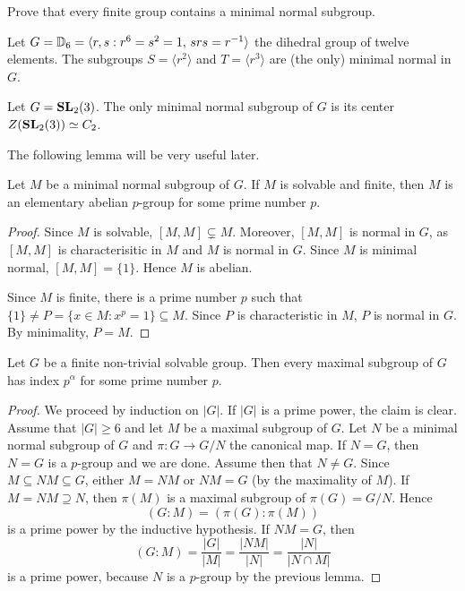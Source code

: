 \begin{exercise}
Prove that every finite group contains a minimal normal subgroup. 
\end{exercise}

\begin{example}
    Let $G=\mathbb{D}_{6}=\langle r,s:r^6=s^2=1,\,srs=r^{-1}\rangle$ the dihedral group of twelve elements. The subgroups
    $S=\langle r^2\rangle$ 
    and $T=\langle r^3\rangle$ are (the only) minimal normal in $G$.
\end{example}

\begin{example}
    Let $G=\mathbf{SL}_2(3)$. The only minimal normal subgroup of $G$ is its center
    $Z(\mathbf{SL}_2(3))\simeq C_2$.
\end{example}


The following lemma will be very useful later. 

\begin{lemma}
\label{lemma:minimal_normal}
Let $M$ be a minimal normal subgroup of $G$. If $M$ is solvable and finite, 
then $M$ is an elementary abelian $p$-group for some prime number $p$. 
\end{lemma}

\begin{proof}
Since $M$ is solvable, $[M,M]\subsetneq M$. Moreover, $[M,M]$ is normal in $G$, as
$[M,M]$ is characterisitic in $M$ and $M$ is normal in $G$. Since $M$ is minimal normal, 
$[M,M]=\{1\}$. Hence $M$ is abelian. 
	
Since $M$ is finite, there is a prime number $p$ such that $\{1\}\ne P=\{x\in
M:x^p=1\}\subseteq M$.  Since $P$ is characteristic in $M$, $P$ is normal in 
$G$. By minimality, $P=M$.
\end{proof}

\begin{theorem}
	Let $G$ be a finite non-trivial solvable group. Then 
		every maximal subgroup of $G$ has index $p^\alpha$ for some prime number $p$. 
\end{theorem}

\begin{proof}
	We proceed by induction on $|G|$.
	If $|G|$ is a prime power, the claim is clear. Assume that $|G|\geq6$ and let $M$ be a maximal subgroup of $G$. 
        Let $N$ be a minimal normal subgroup of $G$ and $\pi\colon G\to G/N$ the canonical map. 
	If $N=G$, then $N=G$ is a $p$-group and we are done. Assume then that 
	$N\ne G$. Since $M\subseteq NM\subseteq G$,
	either $M=NM$ or $NM=G$ (by the maximality of $M$).  If 
	$M=NM\supseteq N$, then $\pi(M)$ is a maximal subgroup of $\pi(G)=G/N$. Hence 
	\[
	(G:M)=(\pi(G):\pi(M))
	\]
	is a prime power by the inductive hypothesis. If 
	$NM=G$, then 
	\[
	(G:M)=\frac{|G|}{|M|}=\frac{|NM|}{|N|}=\frac{|N|}{|N\cap M|}
	\]
	is a prime power, because $N$ is a $p$-group by the previous lemma. 
\end{proof}


